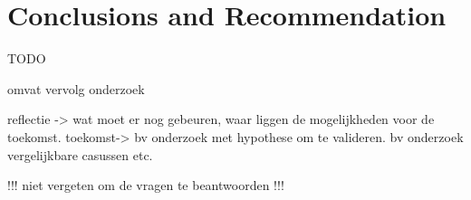 \newpage
\section{Conclusions and Recommendation} \label{Conclusions}

TODO


omvat vervolg onderzoek

reflectie -> wat moet er nog gebeuren, waar liggen de mogelijkheden voor de toekomst.
toekomst-> bv onderzoek met hypothese om te valideren.
bv onderzoek vergelijkbare casussen etc.

!!! niet vergeten om de vragen te beantwoorden !!!